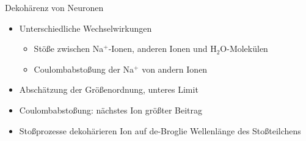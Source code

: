 \begin{frame}{Dekohärenz von Neuronen}
	\begin{itemize}
		\item{Unterschiedliche Wechselwirkungen}
		\begin{itemize}
			\item{Stöße zwischen Na$^{+}$-Ionen, anderen Ionen und H$_{2}$O-Molekülen }
			\item{Coulombabstoßung der Na$^{+}$ von andern Ionen}
		\end{itemize}
		\item{Abschätzung der Größenordnung, unteres Limit}
		\item{Coulombabstoßung: nächstes Ion größter Beitrag}
		\item{Stoßprozesse dekohärieren Ion auf de-Broglie Wellenlänge des Stoßteilchens}
	\end{itemize}
\end{frame}